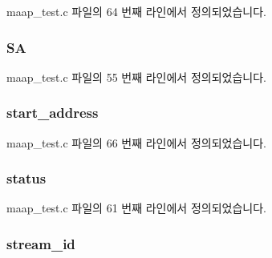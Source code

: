 maap\+\_\+test.\+c 파일의 64 번째 라인에서 정의되었습니다.

\subsubsection[{\texorpdfstring{SA}{SA}}]{ SA}\hypertarget{structmaap__packet_a725bf85ec39adedda8b4adb109c29ded}{}\label{structmaap__packet_a725bf85ec39adedda8b4adb109c29ded}


maap\+\_\+test.\+c 파일의 55 번째 라인에서 정의되었습니다.

\subsubsection[{\texorpdfstring{start\+\_\+address}{start_address}}]{ start\+\_\+address}\hypertarget{structmaap__packet_a435fb25eb186ac591e661f3f1253de25}{}\label{structmaap__packet_a435fb25eb186ac591e661f3f1253de25}


maap\+\_\+test.\+c 파일의 66 번째 라인에서 정의되었습니다.

\subsubsection[{\texorpdfstring{status}{status}}]{ status}\hypertarget{structmaap__packet_ade818037fd6c985038ff29656089758d}{}\label{structmaap__packet_ade818037fd6c985038ff29656089758d}


maap\+\_\+test.\+c 파일의 61 번째 라인에서 정의되었습니다.

\subsubsection[{\texorpdfstring{stream\+\_\+id}{stream_id}}]{ stream\+\_\+id}\hypertarget{structmaap__packet_af5af7b461263e29ceb91a8d3a8bc2c97}{}\label{structmaap__packet_af5af7b461263e29ceb91a8d3a8bc2c97}


